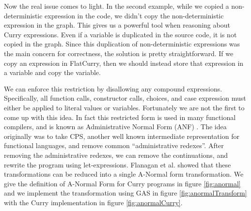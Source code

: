 \documentclass{book}
\makeatletter
\newcommand{\xyS}[1]{\ar@{-}@/-6pt/[#1]}
\newcommand{\xyU}[1]{\ar@{-}@/^6pt/[#1]}
\newcommand{\xyD}[1]{\ar@{-}@/_6pt/[#1]}
\newcommand{\graphxy}[1]{\xymatrix@C=-2pt@R=10pt@C=5pt{#1}}
\newcommand{\xynode}[1]{\llap{#1\,} \bullet }
\theoremstyle{definition}
\makeatother
\begin{document}

Now the real issue comes to light.
In the second example, while we copied a non-deterministic expression in the code,
we didn't copy the non-deterministic expression in the graph.
This gives us a powerful tool when reasoning about Curry expressions.
Even if a variable is duplicated in the source code, it is not copied in the graph.
Since this duplication of non-deterministic expressions was the main concern for correctness,
the solution is pretty straightforward.
If we copy an expression in FlatCurry, then we should instead store that expression
in a variable and copy the variable.

We can enforce this restriction by disallowing any compound expressions.
Specifically, all function calls, constructor calls, choices, and case expression must either
be applied to literal values or variables.
Fortunately we are not the first to come up with this idea.
In fact this restricted form is used in many functional compilers,
and is known as Administrative Normal Form (ANF) \cite{ANormal}.
The idea originally was to take CPS, another well known intermediate representation
for functional languages, and remove common ``administrative redexes''.
After removing the administrative redexes, we can remove the continuations,
and rewrite the program using let-expressions.
Flanagan et al. showed that these transformations can be reduced into a single
A-Normal form transformation.
We give the definition of A-Normal Form for Curry programs in figure
\ref{fig:anormal}
and we implement the transformation using GAS in figure
\ref{fig:anormalTransform} with the Curry implementation in figure \ref{fig:anormalCurry}.
\end{document}
